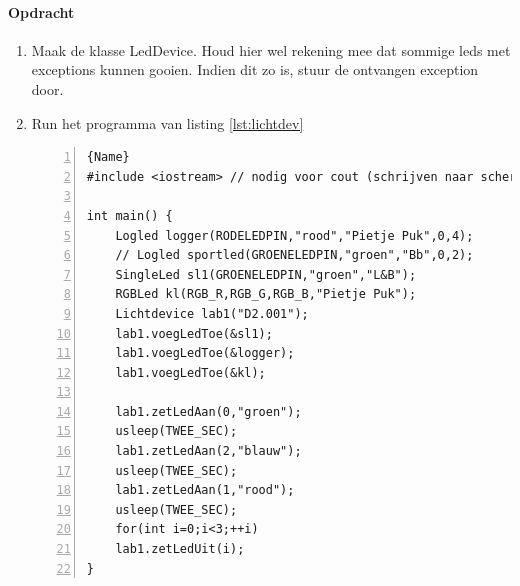 \paragraph{Opdracht}

\begin{enumerate}
	\item Maak de klasse LedDevice. Houd hier wel rekening mee dat sommige leds met exceptions kunnen gooien. Indien dit zo is, stuur de ontvangen exception door.

\newpage
	\item Run het programma van listing \ref{lst:lichtdev}	

\begin{lstlisting}[caption=Twee objecten van de klasse \texttt{LogLed}. ,frame=trbl,firstnumber=1,numbers=left,label={lst:lichtdev}]{Name}
#include <iostream> // nodig voor cout (schrijven naar scherm)

int main() {
	Logled logger(RODELEDPIN,"rood","Pietje Puk",0,4);
	// Logled sportled(GROENELEDPIN,"groen","Bb",0,2);
	SingleLed sl1(GROENELEDPIN,"groen","L&B");
	RGBLed kl(RGB_R,RGB_G,RGB_B,"Pietje Puk");
	Lichtdevice lab1("D2.001");
	lab1.voegLedToe(&sl1);
	lab1.voegLedToe(&logger);
	lab1.voegLedToe(&kl);
	
	lab1.zetLedAan(0,"groen");
	usleep(TWEE_SEC);
	lab1.zetLedAan(2,"blauw");
	usleep(TWEE_SEC);
	lab1.zetLedAan(1,"rood");
	usleep(TWEE_SEC);
	for(int i=0;i<3;++i)
	lab1.zetLedUit(i);
}
\end{lstlisting}
	

\end{enumerate}
